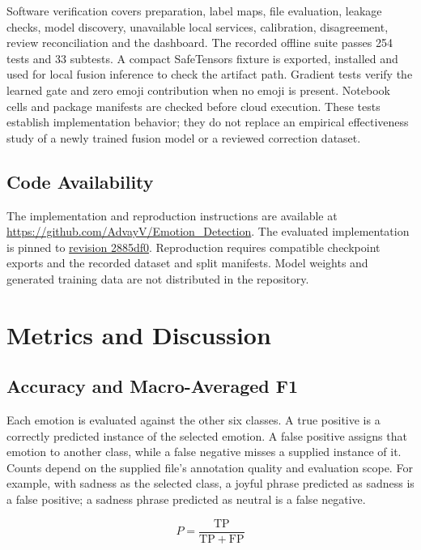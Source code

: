 \documentclass[journal]{IEEEtran}
\begin{document}
Software verification covers preparation, label maps, file evaluation, leakage checks, model discovery, unavailable local services, calibration, disagreement, review reconciliation and the dashboard. The recorded offline suite passes 254 tests and 33 subtests. A compact SafeTensors fixture is exported, installed and used for local fusion inference to check the artifact path. Gradient tests verify the learned gate and zero emoji contribution when no emoji is present. Notebook cells and package manifests are checked before cloud execution. These tests establish implementation behavior; they do not replace an empirical effectiveness study of a newly trained fusion model or a reviewed correction dataset.

\subsection{Code Availability}

The implementation and reproduction instructions are available at \url{https://github.com/AdvayV/Emotion_Detection}. The evaluated implementation is pinned to \href{https://github.com/AdvayV/Emotion_Detection/tree/2885df0933143bb9ce17b2acce9165398ac4ec57}{revision 2885df0}. Reproduction requires compatible checkpoint exports and the recorded dataset and split manifests. Model weights and generated training data are not distributed in the repository.

\section{Metrics and Discussion}

\subsection{Accuracy and Macro-Averaged F1}

Each emotion is evaluated against the other six classes. A true positive is a correctly predicted instance of the selected emotion. A false positive assigns that emotion to another class, while a false negative misses a supplied instance of it. Counts depend on the supplied file's annotation quality and evaluation scope. For example, with sadness as the selected class, a joyful phrase predicted as sadness is a false positive; a sadness phrase predicted as neutral is a false negative.

\begin{equation}
P=\frac{\mathrm{TP}}{\mathrm{TP}+\mathrm{FP}}
\label{eq:precision}
\end{equation}
\end{document}
